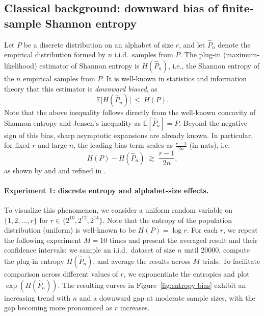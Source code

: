 \documentclass{article}
\theoremstyle{plain}
\theoremstyle{definition}
\begin{document}
\subsection{Classical background: downward bias of finite-sample Shannon entropy}
\label{subsec:plugin_shannon_bias}



Let $P$ be a discrete distribution on an alphabet of size $r$, and let $\widehat P_n$ denote the empirical distribution formed by $n$ i.i.d.\ samples from $P$.
The plug-in (maximum-likelihood) estimator of Shannon entropy is $H(\widehat P_n)$, i.e., the Shannon entropy of the $n$ empirical samples from $P$.
It is well-known in statistics and information theory that this estimator is \textit{downward biased}, as
\begin{equation}\label{eq:plugin_entropy_bias}
    \mathbb{E}\bigl[H(\widehat P_n)\bigr] \:\le\: H(P).
\end{equation}
Note that the above inequality follows directly from the well-known concavity of Shannon entropy and Jensen's inequality as
$\mathbb{E}[\widehat P_n]=P$.
Beyond the negative sign of this bias, sharp asymptotic expansions are already known.
In particular, for fixed $r$ and large $n$, the leading bias term scales as $\frac{r-1}{2n}$ (in nats), i.e.
\begin{equation}
    H(P) - H(\widehat P_n)\; \gtrsim\; \frac{r-1}{2n},
\end{equation}
as shown by \citet{miller1955bias} and \citet{basharin1959entropy} and refined in
\citep{paninski2003entropy,schurmann2004bias}.

\paragraph{Experiment 1: discrete entropy and alphabet-size effects.}
To visualize this phenomenon, we consider a uniform random variable on $\{1,2,\ldots,r\}$ for
$r\in\{2^{10},2^{12}, 2^{14}\}$.
Note that the entropy of the population distribution (uniform) is well-known to be $H(P)=\log r$.
For each $r$, we repeat the following experiment $M=10$ times and present the averaged result and their confidence intervals:
we sample an i.i.d.\ dataset of size $n$ until 20000,   
compute the plug-in entropy $H(\widehat P_n)$, and average the results across $M$ trials.
To facilitate comparison across different values of $r$, we exponentiate the entropies and plot
$\exp(H(\widehat P_n))$.
The resulting curves in Figure~\ref{fig:entropy bias} exhibit an increasing trend with $n$ and a downward gap at moderate sample sizes, with the gap becoming more pronounced as $r$ increases.
\end{document}
